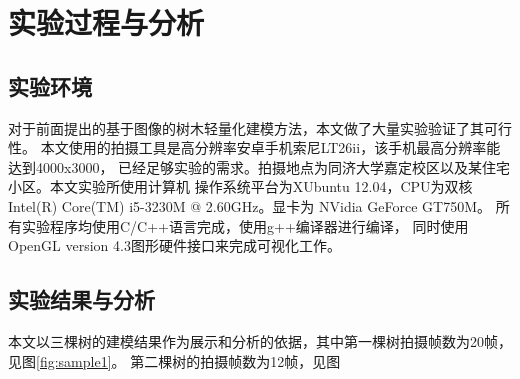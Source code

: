 
\chapter{实验过程与分析}

\section{实验环境}
对于前面提出的基于图像的树木轻量化建模方法，本文做了大量实验验证了其可行性。
本文使用的拍摄工具是高分辨率安卓手机索尼LT26ii，该手机最高分辨率能达到4000x3000，
已经足够实验的需求。拍摄地点为同济大学嘉定校区以及某住宅小区。本文实验所使用计算机
操作系统平台为XUbuntu 12.04，CPU为双核Intel(R) Core(TM) i5-3230M @ 2.60GHz。显卡为
NVidia GeForce GT750M。 所有实验程序均使用C/C++语言完成，使用g++编译器进行编译，
同时使用OpenGL version 4.3图形硬件接口来完成可视化工作。

\section{实验结果与分析}
本文以三棵树的建模结果作为展示和分析的依据，其中第一棵树拍摄帧数为20帧，见图\ref{fig:sample1}。
第二棵树的拍摄帧数为12帧，见图

